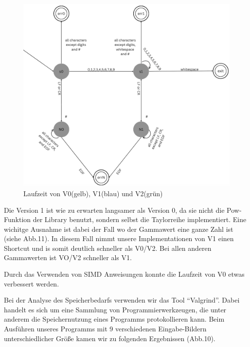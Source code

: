 \documentclass[course=erap]{aspdoc}
\begin{document}
\begin{figure}[h]
\begin{minipage}{0.55\textwidth}
\includegraphics[width=\textwidth]{Bilder/auto2.png}
\caption{Laufzeit von V0(gelb), V1(blau) und V2(grün)}
\end{minipage}
\end{figure}
    
\par
Die Version 1 ist wie zu erwarten langsamer als Version 0, da sie nicht die Pow-Funktion der Library benutzt, sondern selbst die Taylorreihe implementiert. Eine wichitge Ausnahme ist dabei der Fall wo der Gammawert eine ganze Zahl ist (siehe Abb.11). In diesem Fall nimmt unsere Implementationen von V1 einen Shortcut und is somit deutlich schneller als V0/V2. Bei allen anderen Gammawerten ist VO/V2 schneller als V1. 

\par
Durch das Verwenden von SIMD Anweisungen konnte die Laufzeit von V0 etwas verbessert werden.

\par
Bei der Analyse des Speicherbedarfs verwenden wir das Tool “Valgrind”. Dabei handelt es sich um eine Sammlung von Programmierwerkzeugen, die unter anderem die Speichernutzung eines Programms protokollieren kann. Beim Ausführen unseres Programms mit 9 verschiedenen Eingabe-Bildern unterschiedlicher Größe kamen wir zu folgenden Ergebnissen (Abb.10).
\end{document}
